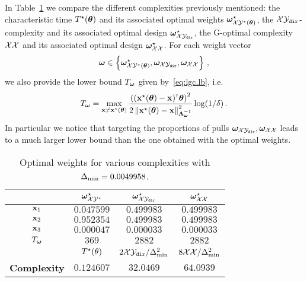 In Table~\ref{table:optimal_weights} we compare the different complexities previously mentioned: the characteristic time $T^{\star}({\boldsymbol \theta})$ and its associated optimal weights ${\boldsymbol \omega}^\star_{\mathcal{X}\mathcal{Y}^\star({\boldsymbol \theta})}$, the $\mathcal{X}\mathcal{Y}_{\texttt{dir}}$-complexity and its associated optimal design ${\boldsymbol \omega}^\star_{\mathcal{X}\mathcal{Y}_{\texttt{dir}}}$, the G-optimal complexity $\mathcal{X}\mathcal{X}$ and its associated optimal design ${\boldsymbol \omega}^\star_{\mathcal{X}\mathcal{X}}$. For each weight vector 
\[
    {\boldsymbol \omega} \in\left\{{\boldsymbol \omega}^\star_{\mathcal{X}\mathcal{Y}^\star({\boldsymbol \theta})},{\boldsymbol \omega}_{\mathcal{X}\mathcal{Y}_{\texttt{dir}}}, {\boldsymbol \omega}_{\mathcal{X}\mathcal{X}}\right\}\,,
\]
we also provide the lower bound $T_{{\boldsymbol \omega}}$ given by~\eqref{eq:lgc.lb}, i.e.
\[
    T_{{\boldsymbol \omega}} = \max_{{\bf x}\neq {\bf x}^\star({\boldsymbol \theta})} \frac{\left(({\bf x}^\star({\boldsymbol \theta})-{\bf x})^\mathsf{\scriptscriptstyle T}{\boldsymbol \theta}\right)^2}{2\left\lVert{\bf x}^\star({\boldsymbol \theta})-{\bf x}\right\rVert_{{\boldsymbol \Lambda}_{{\boldsymbol \omega}}^{-1}}^2} \log(1/\delta)\,.
\]
In particular we notice that targeting the proportions of pulls ${\boldsymbol \omega}_{\mathcal{X}\mathcal{Y}_{\texttt{dir}}}, {\boldsymbol \omega}_{\mathcal{X}\mathcal{X}}$ leads to a much larger lower bound than the one obtained with the optimal weights.
\begin{table}[t!]
\centering
\begin{tabular}{|c|c|c|c|}
 \hline
   & ${\boldsymbol \omega}^\star_{\mathcal{X}\mathcal{Y}^\star}$ & ${\boldsymbol \omega}^\star_{\mathcal{X}\mathcal{Y}_{\texttt{dir}}}$  & ${\boldsymbol \omega}^\star_{\mathcal{X}\mathcal{X}}$   \\
 \hline
 \textbf{${\bf x}_1$} & $0.047599$ & $0.499983$ & $0.499983$ \\
 \hline
 \textbf{${\bf x}_2$} & $0.952354$ & $0.499983$ & $0.499983$ \\
 \hline
 \textbf{${\bf x}_3$} & $0.000047$ & $0.000033$ & $0.000033$ \\
 \hline
 \textbf{$T_{{\boldsymbol \omega}}$} & $369$ & $2882$ & $2882$ \\
 \hline
   & $T^{\star}(\theta)$ & $2\mathcal{X}\mathcal{Y}_{\texttt{dir}}/\Delta_\text{min}^2$ & $8\mathcal{X}\mathcal{X}/\Delta_\text{min}^2$\\
 \hline
  \textbf{Complexity} & $0.124607$ & $32.0469$ & $64.0939$ \\
 \hline
\end{tabular}
\caption{Optimal weights for various complexities with $\Delta_\text{min}= 0.0049958$.}
\label{table:optimal_weights}
\end{table}


